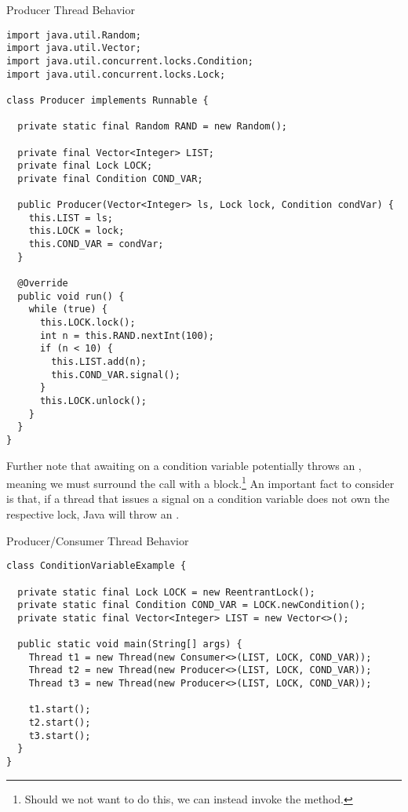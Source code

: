 \begin{cl}{Producer Thread Behavior}
\begin{lstlisting}[language=MyJava]
import java.util.Random;
import java.util.Vector;
import java.util.concurrent.locks.Condition;
import java.util.concurrent.locks.Lock;

class Producer implements Runnable {

  private static final Random RAND = new Random();

  private final Vector<Integer> LIST;
  private final Lock LOCK;
  private final Condition COND_VAR;

  public Producer(Vector<Integer> ls, Lock lock, Condition condVar) {
    this.LIST = ls;
    this.LOCK = lock;
    this.COND_VAR = condVar;
  }

  @Override
  public void run() {
    while (true) {
      this.LOCK.lock();
      int n = this.RAND.nextInt(100);
      if (n < 10) {
        this.LIST.add(n);
        this.COND_VAR.signal();
      }
      this.LOCK.unlock();
    }
  }
}
\end{lstlisting}
\end{cl}

Further note that awaiting on a condition variable potentially throws an , meaning we must surround the call with a  block.\footnote{Should we not want to do this, we can instead invoke the  method.} An important fact to consider is that, if a thread that issues a signal on a condition variable does not own the respective lock, Java will throw an .

\begin{cl}{Producer/Consumer Thread Behavior}
\begin{lstlisting}[language=MyJava]
class ConditionVariableExample {

  private static final Lock LOCK = new ReentrantLock();
  private static final Condition COND_VAR = LOCK.newCondition();
  private static final Vector<Integer> LIST = new Vector<>();

  public static void main(String[] args) {
    Thread t1 = new Thread(new Consumer<>(LIST, LOCK, COND_VAR));
    Thread t2 = new Thread(new Producer<>(LIST, LOCK, COND_VAR));
    Thread t3 = new Thread(new Producer<>(LIST, LOCK, COND_VAR));

    t1.start();
    t2.start();
    t3.start();
  }
}
\end{lstlisting}
\end{cl}

